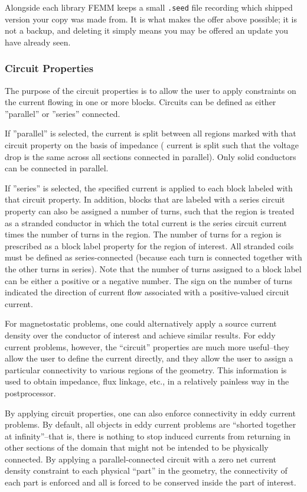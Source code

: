 \documentclass[12pt]{report}
\begin{document}
Alongside each library FEMM keeps a small \verb+.seed+ file recording
which shipped version your copy was made from.  It is what makes the
offer above possible; it is not a backup, and deleting it simply means
you may be offered an update you have already seen.

\subsubsection{Circuit Properties}

The purpose of the circuit properties is to allow the user
to apply constraints on the current flowing in one
or more blocks. Circuits can be defined as either ''parallel'' or
''series'' connected.

If ''parallel'' is selected, the current is
split between all regions marked with that circuit property on the
basis of impedance ({\em} current is split such that the voltage drop
is the same across all sections connected in parallel).  Only solid
conductors can be connected in parallel.

If ''series'' is selected, the specified current is applied to each block
labeled with that circuit property.  In addition, blocks that are
labeled with a series circuit property can also be assigned a number of
turns, such that the region is treated as a stranded conductor in which
the total current is the series circuit current times the number of turns
in the region.  The number of turns for a region is prescribed as a block
label property for the region of interest.  All stranded coils must be
defined as series-connected (because each turn is connected together with
the other turns in series).  Note that the number of turns assigned to
a block label can be either a positive or a negative number.  The sign
on the number of turns indicated the direction of current flow associated
with a positive-valued circuit current.

For magnetostatic problems, one could alternatively apply a source
current density over the conductor of interest and achieve similar
results. For eddy current problems, however, the ``circuit''
properties are much more useful--they allow the user to define the
current directly, and they allow the user to assign a particular connectivity
to various regions of the geometry.  This information is used to
obtain impedance, flux linkage, etc., in a relatively painless way
in the postprocessor.

By applying circuit properties, one can also enforce connectivity
in eddy current problems. By default, all objects in eddy current
problems are ``shorted together at infinity''--that is, there is
nothing to stop induced currents from returning in other sections
of the domain that might not be intended to be physically
connected.  By applying a parallel-connected circuit with a zero net current density
constraint to each physical ``part'' in the geometry, the
connectivity of each part is enforced and all is forced to be
conserved inside the part of interest.
\end{document}
